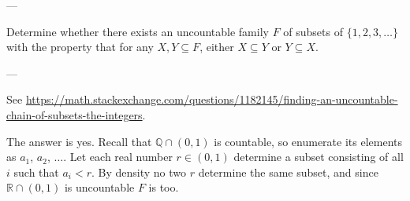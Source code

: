 
---

Determine whether there exists an uncountable family $F$ of subsets of $\{1,2,3,\ldots\}$ with the property that for any $X,Y\subseteq F$, either $X\subseteq Y$ or $Y\subseteq X$.

---

See \url{https://math.stackexchange.com/questions/1182145/finding-an-uncountable-chain-of-subsets-the-integers}.

The answer is yes. Recall that $\mathbb Q\cap(0,1)$ is countable, so enumerate its elements as $a_1$, $a_2$, $\ldots$. Let each real number $r\in(0,1)$ determine a subset consisting of all $i$ such that $a_i<r$. By density no two $r$ determine the same subset, and since $\mathbb R\cap(0,1)$ is uncountable $F$ is too.

